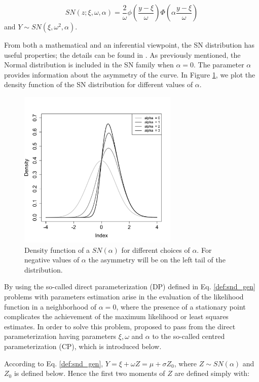 \documentclass[11pt, oneside]{article}
\begin{document}
\begin{equation} \label{def:snd_gen}
SN(z;\xi, \omega, \alpha) = \frac{2}{\omega} \phi\left(\frac{y-\xi}{\omega}\right) \Phi\left(\alpha\frac{y-\xi}{\omega}\right)
\end{equation}
and $Y \sim SN(\xi, \omega^{2}, \alpha)$.

From both a mathematical and an inferential viewpoint, the SN distribution has useful properties; the details can be found in \citet{Azzalini1985}. As previously mentioned, the Normal distribution is included in the SN family when $\alpha=0$. The parameter $\alpha$ provides information about the asymmetry of the curve. In Figure \ref{fig:SN.plot}, we plot the density function of the SN distribution for different values of $\alpha$.

\begin{figure}[htbp]
   \centering
\includegraphics[height = 3in]{Skew_normal_densities.pdf} 
   \caption{Density function of a $SN(\alpha)$ for different choices of $\alpha$. For negative values of $\alpha$ the asymmetry will be on the left tail of the distribution.}
   \label{fig:SN.plot}
\end{figure}

By using the so-called direct parameterization (DP) defined in Eq. \ref{def:snd_gen} problems with parameters estimation arise in the evaluation of the likelihood function in a neighborhood of $\alpha=0$, where the presence of a stationary point complicates the achievement of the maximum likelihood or least squares estimates. In order to solve this problem, \citet{Azzalini1985} proposed to pass from the direct parameterization having parameters $\xi, \omega$ and $\alpha$ to the so-called centred parameterization (CP), which is introduced below. 

According to Eq. \ref{def:snd_gen}, $Y = \xi + \omega Z = \mu + \sigma Z_{0} $, where $Z \sim SN(\alpha)$ and $Z_{0}$ is defined below. Hence the first two moments of $Z$ are defined simply with:
\end{document}
